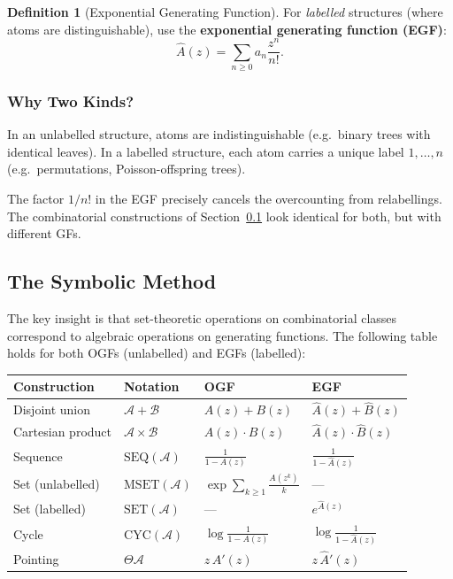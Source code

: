 \documentclass[11pt,a4paper]{article}
\theoremstyle{definition}
\newtheorem{definition}[theorem]{Definition}
\begin{document}
\begin{definition}[Exponential Generating Function]
For \emph{labelled} structures (where atoms are distinguishable), use the
\textbf{exponential generating function (EGF)}:
\begin{equation}
  \hat{A}(z) = \sum_{n \geq 0} a_n \frac{z^n}{n!}.
  \label{eq:egf}
\end{equation}
\end{definition}

\subsubsection{Why Two Kinds?}

In an unlabelled structure, atoms are indistinguishable (e.g.\ binary trees
with identical leaves). In a labelled structure, each atom carries a unique
label $1, \ldots, n$ (e.g.\ permutations, Poisson-offspring trees).

The factor $1/n!$ in the EGF precisely cancels the overcounting from relabellings.
The combinatorial constructions of Section~\ref{sec:symbolic} look identical for
both, but with different GFs.

\subsection{The Symbolic Method}
\label{sec:symbolic}

The key insight is that set-theoretic operations on combinatorial classes
correspond to algebraic operations on generating functions. The following
table holds for both OGFs (unlabelled) and EGFs (labelled):

\begin{center}
\begin{tabular}{llll}
\toprule
Construction & Notation & OGF & EGF \\
\midrule
Disjoint union & $\mathcal{A} + \mathcal{B}$ & $A(z) + B(z)$ & $\hat{A}(z) + \hat{B}(z)$ \\
Cartesian product & $\mathcal{A} \times \mathcal{B}$ & $A(z)\cdot B(z)$ & $\hat{A}(z)\cdot\hat{B}(z)$ \\
Sequence & $\mathrm{SEQ}(\mathcal{A})$ & $\frac{1}{1-A(z)}$ & $\frac{1}{1-\hat{A}(z)}$ \\
Set (unlabelled) & $\mathrm{MSET}(\mathcal{A})$ & $\exp\!\sum_{k\geq 1}\frac{A(z^k)}{k}$ & --- \\
Set (labelled) & $\mathrm{SET}(\mathcal{A})$ & --- & $e^{\hat{A}(z)}$ \\
Cycle & $\mathrm{CYC}(\mathcal{A})$ & $\log\frac{1}{1-A(z)}$ & $\log\frac{1}{1-\hat{A}(z)}$ \\
Pointing & $\Theta\mathcal{A}$ & $z\, A'(z)$ & $z\,\hat{A}'(z)$ \\
\bottomrule
\end{tabular}
\end{center}
\end{document}
